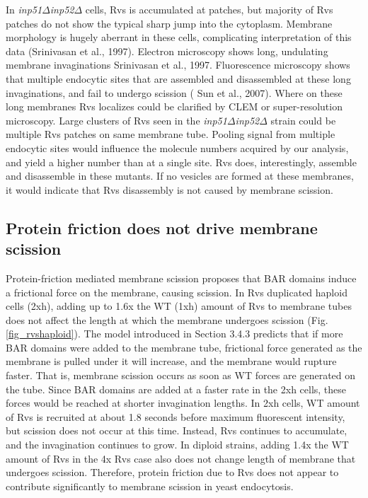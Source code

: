 \vspace{5mm}
In \textit{inp51$\Delta$}\textit{inp52$\Delta$} cells, Rvs is accumulated at patches, but majority of Rvs patches do not show the typical sharp jump into the cytoplasm. Membrane morphology is hugely aberrant in these cells, complicating interpretation of this data (Srinivasan et al., 1997). Electron microscopy shows long, undulating membrane invaginations Srinivasan et al., 1997. Fluorescence microscopy shows that multiple endocytic sites that are assembled and disassembled at these long invaginations, and fail to undergo scission ( Sun et al., 2007). Where on these long membranes Rvs localizes could be clarified by CLEM or super-resolution microscopy. Large clusters of Rvs seen in the \textit{inp51$\Delta$}\textit{inp52$\Delta$} strain could be multiple Rvs patches on same membrane tube. Pooling signal from multiple endocytic sites would influence the molecule numbers acquired by our analysis, and yield a higher number than at a single site. Rvs does, interestingly, assemble and disassemble in these mutants. If no vesicles are formed at these membranes, it would indicate that Rvs disassembly is not caused by membrane scission.


\subsection{Protein friction does not drive membrane scission}
Protein-friction mediated membrane scission proposes that BAR domains induce a frictional force on the membrane, causing scission. In Rvs duplicated haploid cells (2xh), adding up to 1.6x the WT (1xh) amount of Rvs to membrane tubes does not affect the length at which the membrane undergoes scission (Fig.\ref{fig_rvshaploid}). The model introduced in Section 3.4.3 predicts that if more BAR domains were added to the membrane tube, frictional force generated as the membrane is pulled under it will increase, and the membrane would rupture faster. That is, membrane scission occurs as soon as WT forces are generated on the tube. Since BAR domains are added at a faster rate in the 2xh cells, these forces would be reached at shorter invagination lengths. In 2xh cells, WT amount of Rvs is recruited at about 1.8 seconds before maximum fluorescent intensity, but scission does not occur at this time. Instead, Rvs continues to accumulate, and the invagination continues to grow. In diploid strains, adding 1.4x the WT amount of Rvs in the 4x Rvs case also does not change length of membrane that undergoes scission. Therefore, protein friction due to Rvs does not appear to contribute significantly to membrane scission in yeast endocytosis. 


